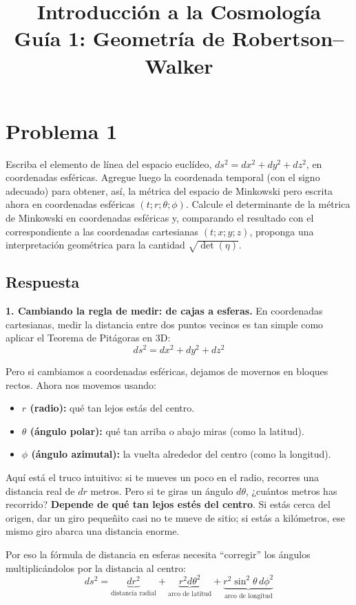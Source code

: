 \documentclass[11pt,a4paper]{article}
\title{\textbf{Introducción a la Cosmología \\ Guía 1: Geometría de Robertson--Walker}}
\date{}
\begin{document}
\maketitle

\section*{Problema 1}
Escriba el elemento de línea del espacio euclídeo, $ds^2=dx^2+dy^2+dz^2$, en coordenadas esféricas. Agregue luego la coordenada temporal (con el signo adecuado) para obtener, así, la métrica del espacio de Minkowski pero escrita ahora en coordenadas esféricas $(t; r; \theta; \phi)$. Calcule el determinante de la métrica de Minkowski en coordenadas esféricas y, comparando el resultado con el correspondiente a las coordenadas cartesianas $(t; x; y; z)$, proponga una interpretación geométrica para la cantidad $\sqrt{\det(\eta)}$.

\subsection*{Respuesta}

\noindent\textbf{1. Cambiando la regla de medir: de cajas a esferas.} En coordenadas cartesianas, medir la distancia entre dos puntos vecinos es tan simple como aplicar el Teorema de Pitágoras en 3D:
\[
ds^2 = dx^2 + dy^2 + dz^2
\]

Pero si cambiamos a coordenadas esféricas, dejamos de movernos en bloques rectos. Ahora nos movemos usando:
\begin{itemize}
    \item \textbf{$r$ (radio):} qué tan lejos estás del centro.
    \item \textbf{$\theta$ (ángulo polar):} qué tan arriba o abajo miras (como la latitud).
    \item \textbf{$\phi$ (ángulo azimutal):} la vuelta alrededor del centro (como la longitud).
\end{itemize}

Aquí está el truco intuitivo: si te mueves un poco en el radio, recorres una distancia real de $dr$ metros. Pero si te giras un ángulo $d\theta$, ¿cuántos metros has recorrido? \textbf{Depende de qué tan lejos estés del centro}. Si estás cerca del origen, dar un giro pequeñito casi no te mueve de sitio; si estás a kilómetros, ese mismo giro abarca una distancia enorme.

Por eso la fórmula de distancia en esferas necesita ``corregir'' los ángulos multiplicándolos por la distancia al centro:
\[
ds^2 = \underbrace{dr^2}_{\text{distancia radial}} + \underbrace{r^2 d\theta^2}_{\text{arco de latitud}} + \underbrace{r^2 \sin^2\theta \, d\phi^2}_{\text{arco de longitud}}
\]
\end{document}

